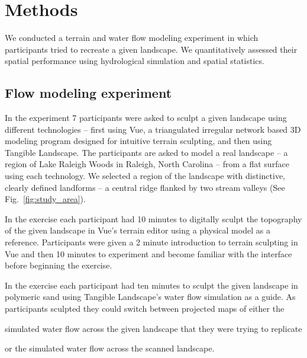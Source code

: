 \documentclass{isprs}
\begin{document}

\section{Methods}\label{sec:methods}
%
We conducted a terrain and water flow modeling experiment 
in which participants tried to recreate a given landscape. 
%
We quantitatively assessed their spatial performance using hydrological simulation and spatial statistics.


\subsection{Flow modeling experiment}
%
In the experiment 7 participants were asked to sculpt a given landscape using different technologies -- 
first using Vue, a triangulated irregular network based 3D modeling program designed for intuitive terrain sculpting, 
and then using Tangible Landscape. 
%
The participants are asked to model a real landscape --
a region of Lake Raleigh Woods 
in Raleigh, North Carolina  -- 
from a flat surface using each technology. 
We selected a region of the landscape with distinctive, 
clearly defined landforms -- a central ridge flanked by two stream valleys 
(See Fig.~\ref{fig:study_area}). 




In the  exercise 
each participant had 10 minutes to digitally sculpt the topography of the given landscape in Vue's terrain editor
using a physical model as a reference. 
Participants were given a 2 minute introduction to terrain sculpting in Vue and then 10 minutes to experiment and become familiar with the interface before beginning the exercise.

In the  exercise each participant had ten minutes to  
sculpt the given landscape in polymeric sand
using Tangible Landscape's water flow simulation
as a guide. 
%
As participants sculpted they could switch between projected maps of either the
\begin{enumerate*}[label=\alph*),font=\itshape]
\item simulated water flow across the given landscape that they were trying to replicate
\item or the simulated water flow across the scanned landscape.
\end{enumerate*}
\end{document}
